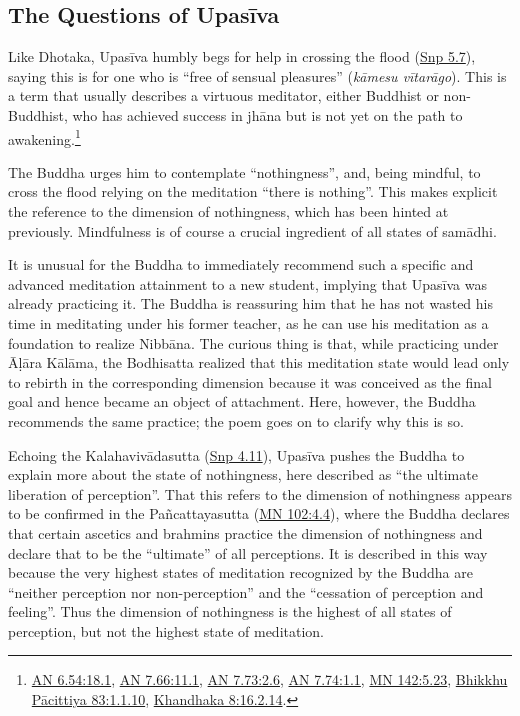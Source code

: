 \documentclass[12pt,openany]{book}%
\begin{document}
\subsection*{The Questions of \textsanskrit{Upasīva}}

Like Dhotaka, \textsanskrit{Upasīva} humbly begs for help in crossing the flood (\href{https://suttacentral.net/snp5.7/en/sujato}{Snp 5.7}), saying this is for one who is “free of sensual pleasures” (\textit{\textsanskrit{kāmesu} \textsanskrit{vītarāgo}}). This is a term that usually describes a virtuous meditator, either Buddhist or non-Buddhist, who has achieved success in \textsanskrit{jhāna} but is not yet on the path to awakening.\footnote{\href{https://suttacentral.net/an6.54/en/sujato\#18.1}{AN 6.54:18.1}, \href{https://suttacentral.net/an7.66/en/sujato\#11.1}{AN 7.66:11.1}, \href{https://suttacentral.net/an7.73/en/sujato\#2.6}{AN 7.73:2.6}, \href{https://suttacentral.net/an7.74/en/sujato\#1.1}{AN 7.74:1.1}, \href{https://suttacentral.net/ mn142/en/sujato\#5.23}{MN 142:5.23}, \href{https://suttacentral.net/pli-tv-bu-vb-pc83/en/sujato\#1.1.10}{Bhikkhu Pācittiya 83:1.1.10}, \href{https://suttacentral.net/pli-tv-kd8/en/sujato\#16.2.14}{Khandhaka 8:16.2.14}. }

The Buddha urges him to contemplate “nothingness”, and, being mindful, to cross the flood relying on the meditation “there is nothing”. This makes explicit the reference to the dimension of nothingness, which has been hinted at previously. Mindfulness is of course a crucial ingredient of all states of \textsanskrit{samādhi}.

It is unusual for the Buddha to immediately recommend such a specific and advanced meditation attainment to a new student, implying that \textsanskrit{Upasīva} was already practicing it. The Buddha is reassuring him that he has not wasted his time in meditating under his former teacher, as he can use his meditation as a foundation to realize \textsanskrit{Nibbāna}. The curious thing is that, while practicing under \textsanskrit{Āḷāra} \textsanskrit{Kālāma}, the Bodhisatta realized that this meditation state would lead only to rebirth in the corresponding dimension because it was conceived as the final goal and hence became an object of attachment. Here, however, the Buddha recommends the same practice; the poem goes on to clarify why this is so.

Echoing the \textsanskrit{Kalahavivādasutta} (\href{https://suttacentral.net/snp4.11/en/sujato}{Snp 4.11}), \textsanskrit{Upasīva} pushes the Buddha to explain more about the state of nothingness, here described as “the ultimate liberation of perception”. That this refers to the dimension of nothingness appears to be confirmed in the \textsanskrit{Pañcattayasutta} (\href{https://suttacentral.net/mn102/en/sujato\#4.4}{MN 102:4.4}), where the Buddha declares that certain ascetics and brahmins practice the dimension of nothingness and declare that to be the “ultimate” of all perceptions. It is described in this way because the very highest states of meditation recognized by the Buddha are “neither perception nor non-perception” and the “cessation of perception and feeling”. Thus the dimension of nothingness is the highest of all states of perception, but not the highest state of meditation.
\end{document}
